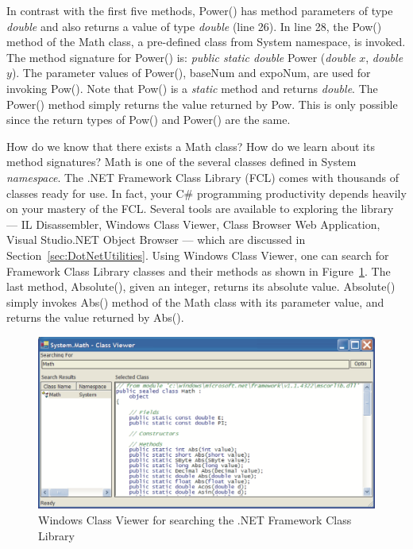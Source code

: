 In contrast with the first five methods, Power() has method
parameters of type \emph{double} and also returns a value of type
\emph{double} (line 26). In line 28, the Pow() method of the Math
class, a pre-defined class from System namespace, is invoked. The
method signature for Power() is: \emph{public static double} Power
(\emph{double} $x$, \emph{double} $y$). The parameter values of
Power(), baseNum and expoNum, are used for invoking Pow(). Note
that Pow() is a \emph{static} method and returns \emph{double}.
The Power() method simply returns the value returned by Pow. This
is only possible since the return types of Pow() and Power() are
the same.


How do we know that there exists a Math class? How do we learn
about its method signatures? Math is one of the several classes
defined in System \emph{namespace}. The .NET Framework Class
Library (FCL) comes with thousands of classes ready for use. In
fact, your C\# programming productivity depends heavily on your
mastery of the FCL. Several tools are available to exploring the
library --- IL Disassembler, Windows Class Viewer, Class Browser
Web Application, Visual Studio.NET Object Browser --- which are
discussed in Section~\ref{sec:DotNetUtilities}. Using Windows
Class Viewer, one can search for Framework Class Library classes
and their methods as shown in Figure~\ref{fig:MathClassViewer}.
The last method, Absolute(), given an integer, returns its
absolute value. Absolute() simply invokes Abs() method of the Math
class with its parameter value, and returns the value returned by
Abs().

\begin{figure}
\centering
\includegraphics[scale=0.45]{./CSharpBasics/Illus/MathClassViewer}
\caption{Windows Class Viewer for searching the .NET Framework
Class Library} \label{fig:MathClassViewer}
\end{figure}


